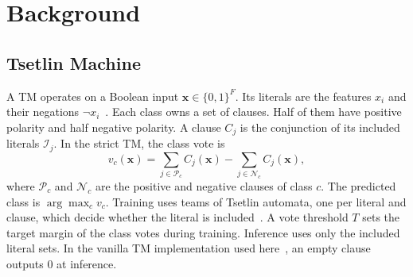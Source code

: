 \section{Background}\label{sec:background}

\subsection{Tsetlin Machine}
A TM operates on a Boolean input $\mathbf{x}\in\{0,1\}^F$.
Its literals are the features $x_i$ and their negations $\lnot x_i$~\cite{granmo2018tsetlin}.
Each class owns a set of clauses. Half of them have positive polarity and half negative polarity.
A clause $C_j$ is the conjunction of its included literals $\mathcal{I}_j$.
In the strict TM, the class vote is
\begin{equation}
v_c(\mathbf{x}) = \sum_{j\in\mathcal{P}_c} C_j(\mathbf{x}) - \sum_{j\in\mathcal{N}_c} C_j(\mathbf{x}),
\end{equation}
where $\mathcal{P}_c$ and $\mathcal{N}_c$ are the positive and negative clauses of class $c$.
The predicted class is $\arg\max_c v_c$.
Training uses teams of Tsetlin automata, one per literal and clause, which decide whether the literal is included~\cite{granmo2018tsetlin}. A vote threshold $T$ sets the target margin of the class votes during training.
Inference uses only the included literal sets.
In the vanilla TM implementation used here~\cite{pytsetlin}, an empty clause outputs 0 at inference.

